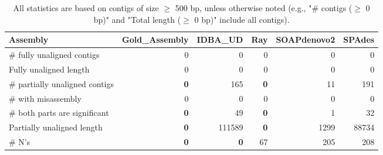 \documentclass[12pt,a4paper]{article}
\begin{document}
\begin{table}[ht]
\begin{center}
\caption{All statistics are based on contigs of size $\geq$ 500 bp, unless otherwise noted (e.g., "\# contigs ($\geq$ 0 bp)" and "Total length ($\geq$ 0 bp)" include all contigs).}
\begin{tabular}{|l*{5}{|r}|}
\hline
Assembly & Gold\_Assembly & IDBA\_UD & Ray & SOAPdenovo2 & SPAdes \\ \hline
\# fully unaligned contigs & 0 & 0 & 0 & 0 & 0 \\ \hline
Fully unaligned length & 0 & 0 & 0 & 0 & 0 \\ \hline
\# partially unaligned contigs & {\bf 0} & 165 & {\bf 0} & 11 & 191 \\ \hline
\hspace{5mm}\# with misassembly & 0 & 0 & 0 & 0 & 0 \\ \hline
\hspace{5mm}\# both parts are significant & {\bf 0} & 49 & {\bf 0} & 1 & 32 \\ \hline
Partially unaligned length & {\bf 0} & 111589 & {\bf 0} & 1299 & 88734 \\ \hline
\# N's & {\bf 0} & {\bf 0} & 67 & 205 & 208 \\ \hline
\end{tabular}
\end{center}
\end{table}
\end{document}
